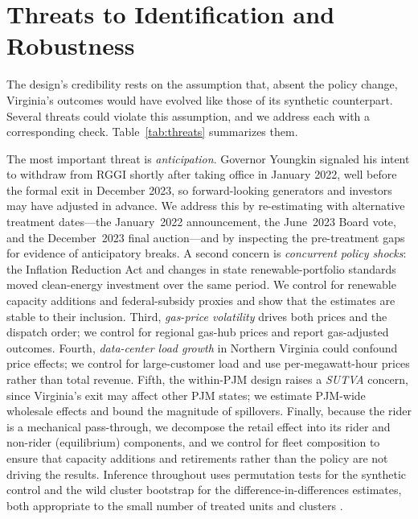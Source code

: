 \documentclass[12pt]{article}
\begin{document}
\section{Threats to Identification and Robustness}\label{sec:threats}
The design's credibility rests on the assumption that, absent the policy change, Virginia's
outcomes would have evolved like those of its synthetic counterpart. Several threats could
violate this assumption, and we address each with a corresponding check.
Table~\ref{tab:threats} summarizes them.

The most important threat is \emph{anticipation}. Governor Youngkin signaled his intent to
withdraw from RGGI shortly after taking office in January 2022, well before the formal exit in
December 2023, so forward-looking generators and investors may have adjusted in advance. We
address this by re-estimating with alternative treatment dates---the January~2022 announcement,
the June~2023 Board vote, and the December~2023 final auction---and by inspecting the
pre-treatment gaps for evidence of anticipatory breaks. A second concern is \emph{concurrent
policy shocks}: the Inflation Reduction Act and changes in state renewable-portfolio standards
moved clean-energy investment over the same period. We control for renewable capacity additions
and federal-subsidy proxies and show that the estimates are stable to their inclusion. Third,
\emph{gas-price volatility} drives both prices and the dispatch order; we control for regional
gas-hub prices and report gas-adjusted outcomes. Fourth, \emph{data-center load growth} in
Northern Virginia could confound price effects; we control for large-customer load and use
per-megawatt-hour prices rather than total revenue. Fifth, the within-PJM design raises a
\emph{SUTVA} concern, since Virginia's exit may affect other PJM states; we estimate PJM-wide
wholesale effects and bound the magnitude of spillovers. Finally, because the rider is a
mechanical pass-through, we decompose the retail effect into its rider and non-rider
(equilibrium) components, and we control for fleet composition to ensure that capacity
additions and retirements rather than the policy are not driving the results. Inference
throughout uses permutation tests for the synthetic control and the wild cluster bootstrap for
the difference-in-differences estimates, both appropriate to the small number of treated units
and clusters \citep{Cattaneo2021_prediction,Cameron2008_bootstrap}.
\end{document}
